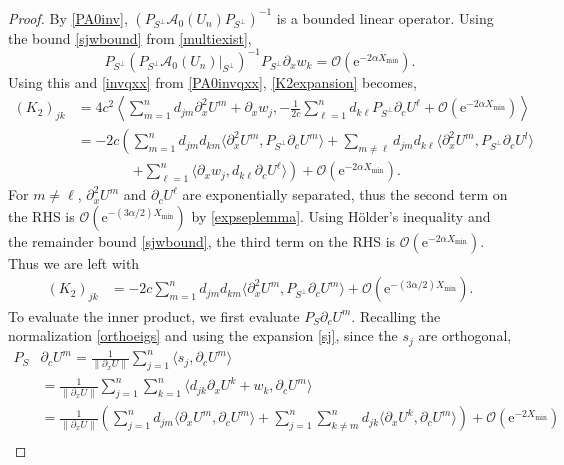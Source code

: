\documentclass[review,onefignum,onetabnum]{siamart171218}
\newcommand{\rme}{\mathrm{e}}
\newcommand{\calA}{\mathcal{A}}
\newcommand{\vK}{\bm{\mathit{K}}}
\begin{document}
\begin{proof}
By \cref{PA0inv}, $(P_{S^\perp} \calA_0(U_n)P_{S^\perp})^{-1}$ is a bounded linear operator. Using the bound \cref{sjwbound} from \cref{multiexist},
\[
P_{S^\perp} (P_{S^\perp} \calA_0(U_n)|_{S^\perp})^{-1} P_{S^\perp}\partial_xw_k = \mathcal{O}(\rme^{-2 \alpha X_{\mathrm{min}}}).
\]
Using this and \cref{invqxx} from \cref{PA0invqxx}, \cref{K2expansion} becomes,
\[
\begin{aligned}
(\vK_2)_{jk}
&= 4 c^2 \left\langle \sum_{m = 1}^{n} d_{jm}\partial_x^2U^m + \partial_xw_j,
-\frac{1}{2c}\sum_{\ell = 1}^{n} d_{k\ell} P_{S^\perp}\partial_cU^\ell + \mathcal{O}(\rme^{-2 \alpha X_{\mathrm{min}}}) \right\rangle \\
&= -2 c \left( \sum_{m = 1}^{n} d_{jm} d_{km} \langle \partial_x^2U^m, P_{S^\perp} \partial_cU^m \rangle
+ \sum_{m\neq \ell} d_{jm} d_{k\ell} \langle \partial_x^2U^m, P_{S^\perp} \partial_cU^l \rangle\right.\\
&\qquad\qquad\left.+ \sum_{\ell=1}^n \langle \partial_xw_j, d_{k\ell}\partial_cU^\ell \rangle \right)
 + \mathcal{O}(\rme^{-2 \alpha X_{\mathrm{min}}}).
\end{aligned}
\]
For $m\neq\ell$, $\partial_x^2U^m$ and $\partial_cU^\ell$ are exponentially separated, thus the second term on the RHS is $\mathcal{O}(\rme^{-(3 \alpha/2) X_{\mathrm{min}}})$ by \cref{expseplemma}. Using H\"{o}lder's inequality and the remainder bound \cref{sjwbound}, the third term on the RHS is $\mathcal{O}(\rme^{-2 \alpha X_{\mathrm{min}}})$. Thus we are left with
\begin{equation}\label{K2step1}
\begin{aligned}
(\vK_2)_{jk}
&= -2 c \sum_{m = 1}^{n} d_{jm} d_{km} \langle \partial_x^2U^m, P_{S^\perp} \partial_cU^m \rangle + \mathcal{O}(\rme^{-(3 \alpha/2) X_{\mathrm{min}}}).
\end{aligned}
\end{equation}
To evaluate the inner product, we first evaluate $P_S \partial_c U^m$. Recalling the normalization \cref{orthoeigs} and using the expansion \cref{sj}, since the $s_j$ are orthogonal,
\[
\begin{aligned}
P_S &\partial_c U^m = \frac{1}{\|\partial_x U\|} \sum_{j=1}^n \langle s_j, \partial_c U^m \rangle \\
&= \frac{1}{\|\partial_x U\|} \sum_{j=1}^n \sum_{k=1}^n \langle d_{jk} \partial_x U^k + w_k, \partial_c U^m \rangle \\
&= \frac{1}{\|\partial_x U\|} \left( \sum_{j=1}^n d_{jm} \langle \partial_x U^m, \partial_c U^m \rangle + \sum_{j=1}^n \sum_{k \neq m}^n d_{jk} \langle \partial_x U^k, \partial_c U^m \rangle \right) + \mathcal{O}(\rme^{-2 X_{\mathrm{min}}}) \\

\end{aligned}\]
\end{proof}
\end{document}
